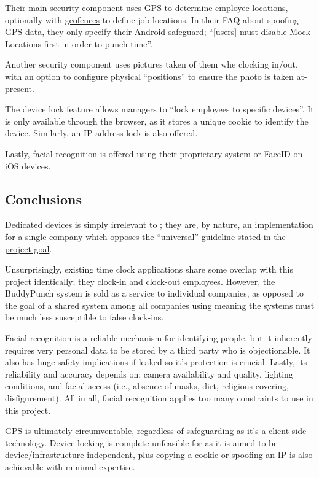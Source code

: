 Their main security component uses \hyperref[ss:gps]{GPS}
to determine employee locations, optionally with
\hyperref[ss:geofencing]{geofences} to define job
locations.
In their FAQ about spoofing GPS data, they only specify
their Android safeguard; \enquote{[users] must disable Mock
  Locations first in order to punch time}.

Another security component uses pictures taken of them whe
clocking in/out, with an option to configure physical
\enquote{positions} to ensure the photo is taken
at-present.

The device lock feature allows managers to \enquote{lock
  employees to specific devices}.
It is only available through the browser, as it stores a
unique cookie to identify the device.
Similarly, an IP address lock is also offered.

Lastly, facial recognition is offered using their
proprietary system or FaceID on iOS devices.

\subsection{Conclusions}

Dedicated devices is simply irrelevant to \projectname{};
they are, by nature, an implementation for a single company
which opposes the \enquote{universal} guideline stated in
the \hyperref[ss:goal]{project goal}.

Unsurprisingly, existing time clock applications share some
overlap with this project identically; they clock-in and
clock-out employees.
However, the BuddyPunch system is sold as a service to
individual companies, as opposed to the goal of a shared
system among all companies using \projectname{} meaning the
systems must be much less susceptible to false clock-ins.

Facial recognition is a reliable mechanism for identifying
people, but it inherently requires very personal data to be
stored by a third party who is objectionable. It also has
huge safety implications if leaked so it's protection is
crucial. Lastly, its reliability and accuracy depends on:
camera availability and quality, lighting conditions, and
facial access (i.e., absence of masks, dirt, religious
covering, disfigurement). All in all, facial recognition
applies too many constraints to use in this project.

GPS is ultimately circumventable, regardless of safeguarding
as it's a client-side technology. Device locking is complete
unfeasible for \projectname{} as it is aimed to be
device/infrastructure independent, plus copying a cookie or
spoofing an IP is also achievable with minimal expertise. 

